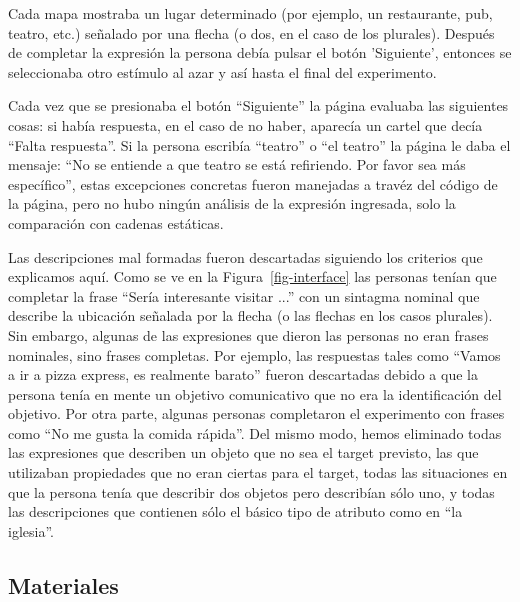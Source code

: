 Cada mapa mostraba un lugar determinado (por ejemplo, un restaurante, pub, teatro, etc.) se\~nalado por una flecha (o dos, en el caso de los plurales). Despu\'es de completar la expresi\'on la persona deb\'ia pulsar el bot\'on 'Siguiente', entonces se seleccionaba otro est\'{i}mulo al azar y as\'{i} hasta el final del experimento.


Cada vez que se presionaba el bot\'on ``Siguiente'' la p\'agina evaluaba las siguientes cosas: si hab\'ia respuesta, en el caso de no haber, aparec\'ia un cartel que dec\'ia ``Falta respuesta''.
Si la persona escrib\'ia ``teatro'' o ``el teatro'' la p\'agina le daba el mensaje: ``No se entiende a que teatro se est\'a refiriendo. Por favor sea m\'as espec\'ifico'', estas excepciones concretas fueron manejadas a trav\'ez del c\'odigo  de la p\'agina, pero no hubo ning\'un an\'alisis de la expresi\'on ingresada, solo la comparaci\'on con cadenas est\'aticas.

Las descripciones mal formadas fueron descartadas siguiendo los criterios que explicamos aqu\'{i}. Como se ve en la Figura~\ref{fig-interface} las personas ten\'{i}an que completar la frase ``Ser\'{i}a interesante visitar ...'' con un sintagma nominal que describe la ubicaci\'on se\~nalada por la flecha (o las flechas en los casos plurales). Sin embargo, algunas de las expresiones que dieron las personas no eran frases nominales, sino frases completas. Por ejemplo, las respuestas tales como ``Vamos a ir a pizza express, es realmente barato'' fueron descartadas debido a que la persona ten\'{i}a en mente un objetivo comunicativo que no era la identificaci\'on del objetivo. Por otra parte, algunas personas completaron el experimento con frases como ``No me gusta la comida r\'apida''. Del mismo modo, hemos eliminado todas las expresiones que describen un objeto que no sea el target previsto, las que utilizaban propiedades que no eran ciertas para el target, todas las situaciones en que la persona ten\'{i}a que describir dos objetos pero describ\'ian s\'olo uno, y todas las descripciones que contienen s\'olo el b\'asico tipo de atributo como en ``la iglesia''.



\subsection{Materiales}
\label{corpus-materiales}

